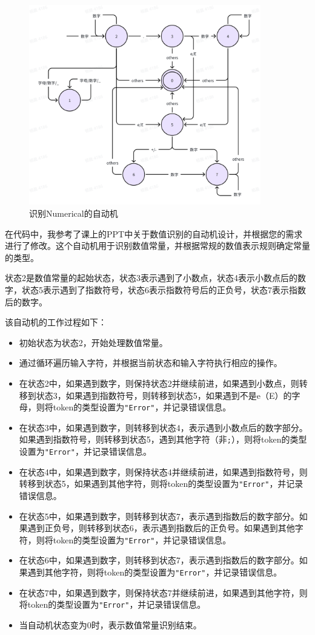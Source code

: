 \documentclass[lang=cn,11pt,a4paper]{elegantpaper}
\begin{document}
\begin{figure}[!htb]
    \centering
    \includegraphics[width=0.9\textwidth]{image/Numerical.png}
    \caption{识别Numerical的自动机}
\end{figure}

在代码中，我参考了课上的PPT中关于数值识别的自动机设计，并根据您的需求进行了修改。这个自动机用于识别数值常量，并根据常规的数值表示规则确定常量的类型。

状态2是数值常量的起始状态，状态3表示遇到了小数点，状态4表示小数点后的数字，状态5表示遇到了指数符号，状态6表示指数符号后的正负号，状态7表示指数后的数字。

该自动机的工作过程如下：
\begin{itemize}
    \item 初始状态为状态2，开始处理数值常量。
    \item 通过循环遍历输入字符，并根据当前状态和输入字符执行相应的操作。
    \item 在状态2中，如果遇到数字，则保持状态2并继续前进，如果遇到小数点，则转移到状态3，如果遇到指数符号，则转移到状态5，如果遇到不是e（E）的字母，则将token的类型设置为\lstinline{"Error"}，并记录错误信息。
    \item 在状态3中，如果遇到数字，则转移到状态4，表示遇到小数点后的数字部分。如果遇到指数符号，则转移到状态5，遇到其他字符（非\lstinline{;}），则将token的类型设置为\lstinline{"Error"}，并记录错误信息。
    \item 在状态4中，如果遇到数字，则保持状态4并继续前进，如果遇到指数符号，则转移到状态5，如果遇到其他字符，则将token的类型设置为\lstinline{"Error"}，并记录错误信息。
    \item 在状态5中，如果遇到数字，则转移到状态7，表示遇到指数后的数字部分。如果遇到正负号，则转移到状态6，表示遇到指数后的正负号。如果遇到其他字符，则将token的类型设置为\lstinline{"Error"}，并记录错误信息。
    \item 在状态6中，如果遇到数字，则转移到状态7，表示遇到指数后的数字部分。如果遇到其他字符，则将token的类型设置为\lstinline{"Error"}，并记录错误信息。
    \item 在状态7中，如果遇到数字，则保持状态7并继续前进，如果遇到其他字符，则将token的类型设置为\lstinline{"Error"}，并记录错误信息。
    \item 当自动机状态变为0时，表示数值常量识别结束。
\end{itemize}
\end{document}
